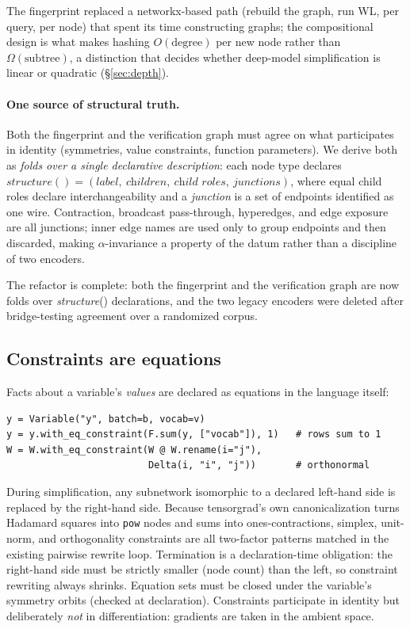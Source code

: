 \documentclass[sigplan,10pt,review]{acmart}
\begin{document}
The fingerprint replaced a networkx-based \cite{networkx} path (rebuild the graph, run WL,
per query, per node) that spent its time constructing graphs; the
compositional design is what makes hashing $O(\text{degree})$ per new node
rather than $\Omega(\text{subtree})$, a distinction that decides whether
deep-model simplification is linear or quadratic
(\S\ref{sec:depth}).

\paragraph{One source of structural truth.}
Both the fingerprint and the verification graph must agree on what
participates in identity (symmetries, value constraints, function
parameters). We derive both as \emph{folds over a single declarative
description}: each node type declares
$\textit{structure}() = (\textit{label},\ \textit{children},\
\textit{child roles},\ \textit{junctions})$, where equal child roles
declare interchangeability and a \emph{junction} is a set of endpoints
identified as one wire. Contraction, broadcast pass-through, hyperedges,
and edge exposure are all junctions; inner edge names are used only to
group endpoints and then discarded, making $\alpha$-invariance a property
of the datum rather than a discipline of two encoders.

The refactor is complete: both the fingerprint and the verification
graph are now folds over \textit{structure}() declarations, and the two
legacy encoders were deleted after bridge-testing agreement over a
randomized corpus.

\subsection{Constraints are equations}\label{sec:constraints}

Facts about a variable's \emph{values} are declared as equations in the
language itself:

\begin{lstlisting}
y = Variable("y", batch=b, vocab=v)
y = y.with_eq_constraint(F.sum(y, ["vocab"]), 1)   # rows sum to 1
W = W.with_eq_constraint(W @ W.rename(i="j"),
                         Delta(i, "i", "j"))       # orthonormal
\end{lstlisting}

During simplification, any subnetwork isomorphic to a declared left-hand
side is replaced by the right-hand side. Because tensorgrad's own
canonicalization turns Hadamard squares into \texttt{pow} nodes and sums
into ones-contractions, simplex, unit-norm, and orthogonality constraints
are all two-factor patterns matched in the existing pairwise rewrite loop.
Termination is a declaration-time obligation: the right-hand side must be
strictly smaller (node count) than the left, so constraint rewriting
always shrinks. Equation sets must be closed under the variable's symmetry
orbits (checked at declaration). Constraints participate in identity but
deliberately \emph{not} in differentiation: gradients are taken in the
ambient space.
\end{document}
